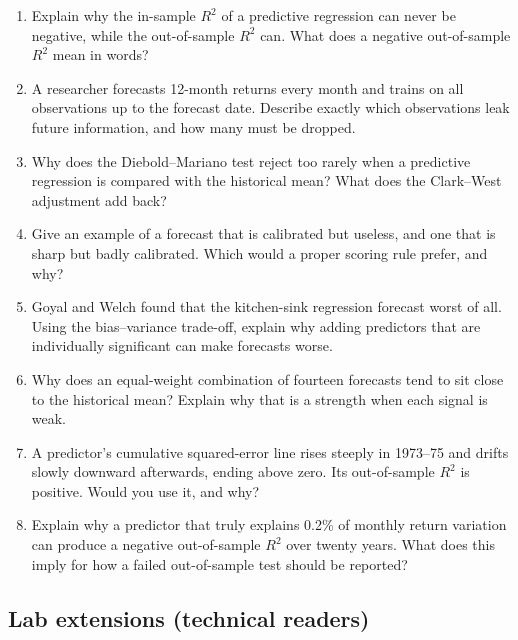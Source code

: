 \begin{enumerate}
  \item Explain why the in-sample $R^2$ of a predictive regression can never be negative, while the out-of-sample $R^2$ can. What does a negative out-of-sample $R^2$ mean in words?
  \item A researcher forecasts 12-month returns every month and trains on all observations up to the forecast date. Describe exactly which observations leak future information, and how many must be dropped.
  \item Why does the Diebold--Mariano test reject too rarely when a predictive regression is compared with the historical mean? What does the Clark--West adjustment add back?
  \item Give an example of a forecast that is calibrated but useless, and one that is sharp but badly calibrated. Which would a proper scoring rule prefer, and why?
  \item Goyal and Welch found that the kitchen-sink regression forecast worst of all. Using the bias--variance trade-off, explain why adding predictors that are individually significant can make forecasts worse.
  \item Why does an equal-weight combination of fourteen forecasts tend to sit close to the historical mean? Explain why that is a strength when each signal is weak.
  \item A predictor's cumulative squared-error line rises steeply in 1973--75 and drifts slowly downward afterwards, ending above zero. Its out-of-sample $R^2$ is positive. Would you use it, and why?
  \item Explain why a predictor that truly explains 0.2\% of monthly return variation can produce a negative out-of-sample $R^2$ over twenty years. What does this imply for how a failed out-of-sample test should be reported?
\end{enumerate}

\subsection*{Lab extensions (technical readers)}


